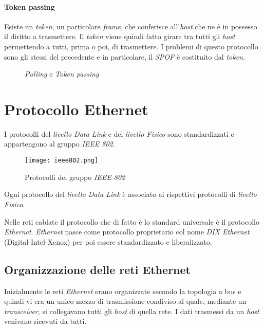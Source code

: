 \paragraph{Token passing}
Esiste un \emph{token}, un particolare \emph{frame}, che conferisce
all'\emph{host} che ne è in possesso il diritto a trasmettere. Il \emph{token}
viene quindi fatto girare tra tutti gli \emph{host} permettendo a tutti, prima
o poi, di trasmettere. I problemi di questo protocollo sono gli stessi del
precedente e in particolare, il \emph{SPOF} è costituito dal \emph{token}.

\begin{figure}[h!]
    \centering
    \hspace{-0.5cm}
    \hspace{3cm}
    \caption{\emph{Polling} e \emph{Token passing}}
\end{figure}

\section{Protocollo Ethernet}
I protocolli del \emph{livello Data Link} e del \emph{livello Fisico} sono
standardizzati e appartengono al gruppo \emph{IEEE 802}.
\begin{figure}[h!]
    \centering
    \texttt{[image: ieee802.png]}
    \caption{Protocolli del gruppo \emph{IEEE 802}}
\end{figure}

\begin{note}
    Ogni protocollo del \emph{livello Data Link} è associato ai rispettivi
    protocolli di \emph{livello Fisico}.
\end{note}\noindent
Nelle reti cablate il protocollo che di fatto è lo standard universale è il
protocollo \emph{Ethernet}. \emph{Ethernet} nasce come protocollo proprietario
col nome \emph{DIX Ethernet} (Digital-Intel-Xenox) per poi essere standardizzato
e liberalizzato.

\subsection{Organizzazione delle reti Ethernet}
Inizialmente le reti \emph{Ethernet} erano organizzate secondo la topologia a
bus e quindi vi era un unico mezzo di trasmissione condiviso al quale,
mediante un \emph{transceiver}, si collegavano tutti gli \emph{host} di quella
rete. I dati trasmessi da un \emph{host} venivano ricevuti da tutti.

